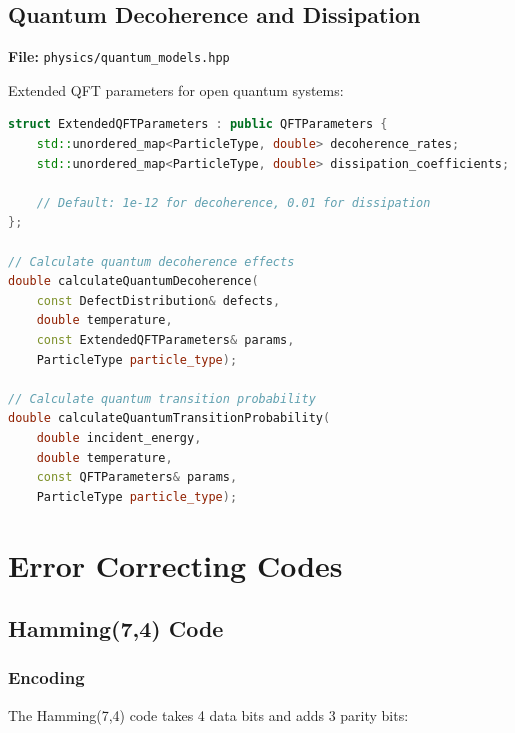 \documentclass[11pt,a4paper]{article}
\begin{document}
\subsection{Quantum Decoherence and Dissipation}

\textbf{File:} \texttt{physics/quantum\_models.hpp}

Extended QFT parameters for open quantum systems:

\begin{lstlisting}[language=C++, basicstyle=\footnotesize\ttfamily]
struct ExtendedQFTParameters : public QFTParameters {
    std::unordered_map<ParticleType, double> decoherence_rates;
    std::unordered_map<ParticleType, double> dissipation_coefficients;

    // Default: 1e-12 for decoherence, 0.01 for dissipation
};

// Calculate quantum decoherence effects
double calculateQuantumDecoherence(
    const DefectDistribution& defects,
    double temperature,
    const ExtendedQFTParameters& params,
    ParticleType particle_type);

// Calculate quantum transition probability
double calculateQuantumTransitionProbability(
    double incident_energy,
    double temperature,
    const QFTParameters& params,
    ParticleType particle_type);
\end{lstlisting}

\newpage
\section{Error Correcting Codes}

\subsection{Hamming(7,4) Code}

\subsubsection{Encoding}

The Hamming(7,4) code takes 4 data bits and adds 3 parity bits:
\end{document}
